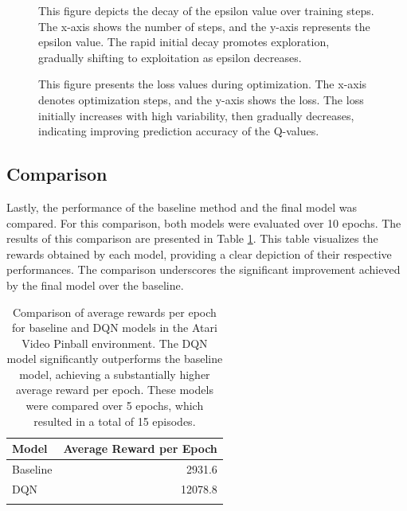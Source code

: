 \documentclass[twocolumn]{webofc}
\begin{document}
\begin{figure}[!h]
\centering
\centerline{}
\caption{This figure depicts the decay of the epsilon value over training steps. The x-axis shows the number of steps, and the y-axis represents the epsilon value. The rapid initial decay promotes exploration, gradually shifting to exploitation as epsilon decreases.}
\label{fig: epsilon_decay}
\end{figure}

\begin{figure}[!h]
\centering
\centerline{}
\caption{This figure presents the loss values during optimization. The x-axis denotes optimization steps, and the y-axis shows the loss. The loss initially increases with high variability, then gradually decreases, indicating improving prediction accuracy of the Q-values.}
\label{fig: loss}
\end{figure}


\subsection{Comparison}
Lastly, the performance of the baseline method and the final model was compared. For this comparison, both models were evaluated over 10 epochs. The results of this comparison are presented in Table \ref{tab: results}. This table visualizes the rewards obtained by each model, providing a clear depiction of their respective performances. The comparison underscores the significant improvement achieved by the final model over the baseline.

\begin{table}[!h]
    \centering
    \begin{tabular}{lr}
        \toprule
         \textbf{Model} & \textbf{Average Reward per Epoch} 
         \\ \midrule
         Baseline & 2931.6  \\ \addlinespace
         DQN & 12078.8 \\ \addlinespace
         \bottomrule
    \end{tabular}
    \caption{Comparison of average rewards per epoch for baseline and DQN models in the Atari Video Pinball environment. The DQN model significantly outperforms the baseline model, achieving a substantially higher average reward per epoch. These models were compared over 5 epochs, which resulted in a total of 15 episodes.}
    \label{tab: results}
\end{table}
\end{document}
